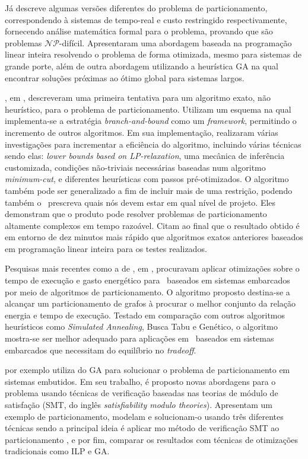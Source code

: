    Já \citet{Arato2003} descreve algumas versões diferentes do problema de particionamento, correspondendo à sistemas de tempo-real e custo restringido respectivamente, fornecendo análise matemática formal para o problema, provando que são problemas $ \mathcal{NP} $-difícil. 
   Apresentaram uma abordagem baseada na programação linear inteira resolvendo o problema de forma otimizada, mesmo para sistemas de grande porte, além de outra abordagem utilizando a heurística GA na qual encontrar soluções próximas ao ótimo global para sistemas largos.
   
   \citeauthor{Mann2007}, em \citeyear{Mann2007}, descreveram uma primeira tentativa para um algoritmo exato, não heurístico, para o problema de particionamento. 
   Utilizam um esquema na qual implementa-se a estratégia \textit{branch-and-bound} como um \textit{framework}, permitindo o incremento de outros algoritmos. 
   Em sua implementação, realizaram várias investigações para incrementar a eficiência do algoritmo, incluindo várias técnicas sendo elas: \textit{lower bounds based on LP-relaxation}, uma mecânica de inferência customizada, condições não-triviais necessárias baseadas num algoritmo \textit{minimum-cut}, e diferentes heurísticas com passos pré-otimizados. 
   O algoritmo também pode ser generalizado a fim de incluir mais de uma restrição, podendo também o \designer\ prescreva quais nós devem estar em qual nível de projeto. 
   Eles demonstram que o produto pode resolver problemas de particionamento altamente complexos em tempo razoável. 
   Citam ao final que o resultado obtido é em entorno de dez minutos mais rápido que algoritmos exatos anteriores baseados em programação linear inteira para os testes realizados.
   
   Pesquisas mais recentes como a de \citeauthor{Hassine2017}, em \citeyear{Hassine2017}, procuravam aplicar otimizações sobre o tempo de execução e gasto energético para \cores\ baseados em sistemas embarcados por meio de algoritmos de particionamento.
   O algoritmo proposto destina-se a alcançar um particionamento de grafos à procurar o melhor conjunto da relação energia e tempo de execução.
   Testado em comparação com outros algoritmos heurísticos como \textit{Simulated Annealing}, Busca Tabu e Genético, o algoritmo mostra-se ser melhor adequado para aplicações em \cores\ baseados em sistemas embarcados que necessitam do equilíbrio no \textit{tradeoff}.
   
   \citet{Trindade2016} por exemplo utiliza do GA para solucionar o problema de particionamento em sistemas embutidos. 
   Em seu trabalho, é proposto novas abordagens para o problema usando técnicas de verificação baseadas nas teorias de módulo de satisfação (SMT, do inglês \textit{satisfiability modulo theories}). 
   Apresentam um exemplo de particionamento, modelam e solucionam-o usando três diferentes técnicas sendo a principal ideia é aplicar mo método de verificação SMT ao particionamento \hs, e por fim, comparar os resultados com técnicas de otimizações tradicionais como ILP e GA.

